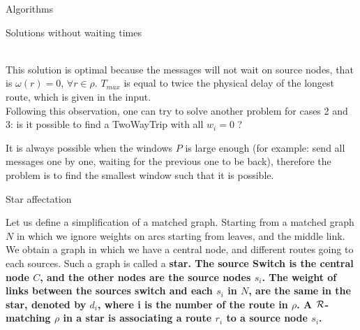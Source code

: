 \documentclass[a4paper,10pt]{report}
\begin{document}
\begin{chapter}{Algorithms}
\begin{section}{Solutions without waiting times}
{{{
 }}}\\

This solution is optimal because the messages will not wait on source nodes, that is $\omega(r) = 0$, $\forall r \in \rho$. $T_{max}$ is
equal to twice the physical delay of the longest route, which is given in the input.\\


Following this observation, one can try to solve another problem for cases 2 and 3: is it possible to find a TwoWayTrip
with all $w_i = 0$ ? 

It is always possible when the windows $P$ is large enough (for example: send all messages one by one, waiting for the previous one to be back),
therefore the problem is to find the smallest window such that it is possible.

\begin{subsection}{Star affectation}
 
Let us define a simplification of a matched graph. 
Starting from a matched graph $N$ in which we ignore weights on arcs starting from leaves, and the middle link.
We obtain a graph in which we have a central node, and different routes going to each sources.
Such a graph is called a \bf{star}.
The source Switch is the central node $C$, and the other nodes are the source nodes $s_i$. 
The weight of links between the sources switch and each $s_i$ in $N$, are the same in the star, denoted by $d_i$, where i is the number of the route in $\rho$. 
A ${\cal R}$-matching $\rho$ in a star is associating a route $r_i$ to a source node $s_i$.\\

\fbox{\parbox{11cm}{

\begin{center}


\end{center}}}
\end{subsection}
\end{section}
\end{chapter}
\end{document}
